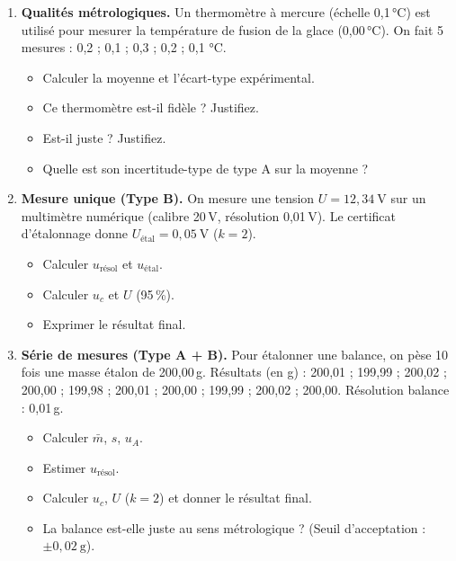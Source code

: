 \documentclass[11pt]{article}
\begin{document}
\begin{exercice}
\begin{enumerate}
\item \textbf{Qualités métrologiques.} Un thermomètre à mercure (échelle 0,1\,°C) est utilisé pour mesurer la température de fusion de la glace (0,00\,°C). On fait 5 mesures : 0,2 ; 0,1 ; 0,3 ; 0,2 ; 0,1 °C.
\begin{itemize}
\item[a)] Calculer la moyenne et l'écart-type expérimental.
\item[b)] Ce thermomètre est-il fidèle ? Justifiez.
\item[c)] Est-il juste ? Justifiez.
\item[d)] Quelle est son incertitude-type de type A sur la moyenne ?
\end{itemize}
\item \textbf{Mesure unique (Type B).} On mesure une tension $U = 12,34\ \mathrm{V}$ sur un multimètre numérique (calibre 20\,V, résolution 0,01\,V). Le certificat d'étalonnage donne $U_{\text{étal}} = 0,05\ \mathrm{V}$ ($k=2$).
\begin{itemize}
\item[a)] Calculer $u_{\text{résol}}$ et $u_{\text{étal}}$.
\item[b)] Calculer $u_c$ et $U$ (95\,\%).
\item[c)] Exprimer le résultat final.
\end{itemize}
\item \textbf{Série de mesures (Type A + B).} Pour étalonner une balance, on pèse 10 fois une masse étalon de 200,00\,g. Résultats (en g) : 200,01 ; 199,99 ; 200,02 ; 200,00 ; 199,98 ; 200,01 ; 200,00 ; 199,99 ; 200,02 ; 200,00. Résolution balance : 0,01\,g.
\begin{itemize}
\item[a)] Calculer $\bar{m}$, $s$, $u_A$.
\item[b)] Estimer $u_{\text{résol}}$.
\item[c)] Calculer $u_c$, $U$ ($k=2$) et donner le résultat final.
\item[d)] La balance est-elle juste au sens métrologique ? (Seuil d'acceptation : $\pm 0,02\ \mathrm{g}$).
\end{itemize}
\end{enumerate}
\end{exercice}
\end{document}
